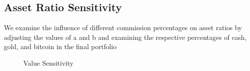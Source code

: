 \documentclass{mcmthesis}
\begin{document}
\subsection{Asset Ratio Sensitivity}
We examine the influence of different commission percentages on asset ratios by adjusting the values of a and b and examining the respective percentages of cash, gold, and bitcoin in the final portfolio

\begin{figure}[H]
	\centering
	\quad
	\quad
	\quad
	\quad
	\caption{Value Sensitivity}
\end{figure}
\end{document}
